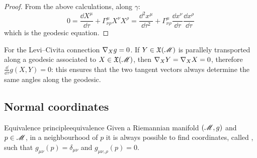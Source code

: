 \begin{proofbox}
  \begin{proof}
    From the above calculations, along $ \gamma $:
    \begin{equation*}
      0 = \frac{\dd X^\mu}{\dd \tau} + \Gamma^\mu_{\nu \rho} X^\nu X^\rho = \frac{\dd^2 x^\mu}{\dd \tau^2} + \Gamma^\mu_{\nu \rho} \frac{\dd x^\nu}{\dd \tau} \frac{\dd x^\rho}{\dd \tau}
    \end{equation*}
    which is the geodesic equation.
  \end{proof}
\end{proofbox}

For the Levi--Civita connection $ \nabla_X g = 0 $. If $ Y \in \mathfrak{X}(\mathscr{M}) $ is parallely transported along a geodesic associated to $ X \in \mathfrak{X}(\mathscr{M}) $, then $ \nabla_X Y = \nabla_X X = 0 $, therefore $ \frac{\dd}{\dd \tau} g(X,Y) = 0 $: this ensures that the two tangent vectors always determine the same angles along the geodesic.

\subsection{Normal coordinates}

\begin{theorem}{Equivalence principle}{equivalence}
  Given a Riemannian manifold $ (\mathscr{M},g) $ and $ p \in \mathscr{M} $, in a neighbourhood of $ p $ it is always possible to find coordinates, called , such that $ g_{\mu \nu}(p) = \delta_{\mu \nu} $ and $ g_{\mu \nu , \rho}(p) = 0 $.
\end{theorem}

